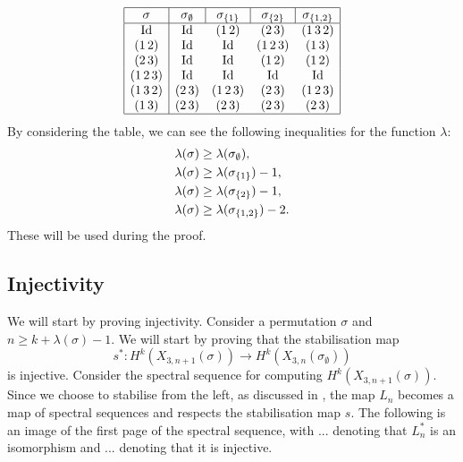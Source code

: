 \[
\begin{array}{|c|cccc|}
  \hline
  \sigma & \multicolumn{1}{c|}{\sigma_\emptyset} 
  & \multicolumn{1}{c|}{\sigma_{\set{1}}} 
  & \multicolumn{1}{c|}{\sigma_{\set{2}}} & \sigma_{\set{1,2}} \\
  \hline
  \Id & \Id & (1\,2) & (2\,3) & (1\,3\,2) \\
  (1\,2) & \Id & \Id & (1\,2\,3) & (1\,3) \\
  (2\,3) & \Id & \Id & (1\,2) & (1\,2) \\
  (1\,2\,3) & \Id & \Id & \Id & \Id \\
  (1\,3\,2) & (2\,3) & (1\,2\,3) & (2\,3) & (1\,2\,3) \\
  (1\,3) & (2\, 3) & (2\,3) & (2\,3) & (2\,3) \\
  \hline
\end{array}
\] 
By considering the table, we can see the following inequalities for
the function $\lambda$:
\begin{align*}
  \lambda(\sigma) &\geq \lambda(\sigma_{\emptyset}), \\
  \lambda(\sigma) &\geq \lambda(\sigma_{\left\{ 1 \right\}}) - 1, \\
  \lambda(\sigma) &\geq \lambda(\sigma_{\left\{ 2 \right\}}) - 1, \\
  \lambda(\sigma) &\geq \lambda(\sigma_{\left\{ 1,2 \right\}}) - 2. \\
\end{align*}
These will be used during the proof.

\subsection{Injectivity}

We will start by proving injectivity. Consider a permutation $\sigma$
and $n \geq k + \lambda(\sigma) - 1$. We will start by proving that
the stabilisation map
\[ s^* : H^k(X_{3,n+1}(\sigma)) \to
H^k(X_{3,n}(\sigma_{\emptyset})) \]
is injective. Consider the spectral sequence for computing
$H^k(X_{3,n+1}(\sigma))$. Since we choose to stabilise from the left,
as discussed in , the map $L_n$
becomes a map of spectral sequences and respects the stabilisation map
$s$. The
following is an image of the first page of the spectral sequence, with
... denoting that $L_n^*$ is an isomorphism and ... denoting
that it is injective. 

